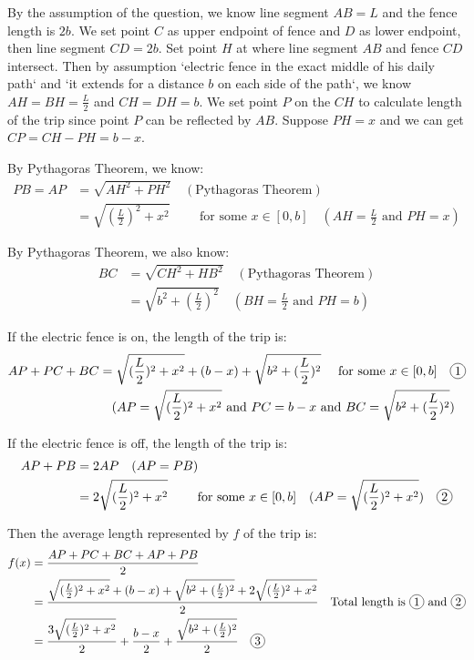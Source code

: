\documentclass[12pt]{exam}
\newcommand*\circled[1]{\tikz[baseline=(char.base)]{
    \node[shape=circle, draw, inner sep=1pt, 
        minimum height=12pt] (char) {#1};}}
\begin{document}
\begin{enumerate}
By the assumption of the question, we know line segment $AB=L$ and the fence length is $2b$. We set point $C$ as upper endpoint of fence and $D$ as lower endpoint, then line segment $CD=2b$. Set point $H$ at where line segment $AB$ and fence $CD$ intersect. Then by assumption `electric fence in the exact middle of his daily path` and `it extends for a distance $b$ on each side of the path`, we know $AH=BH=\frac{L}{2}$ and $CH=DH=b$. We set point $P$ on the $CH$ to calculate length of the trip since point $P$ can be reflected by $AB$. Suppose $PH=x$ and we can get $CP=CH-PH=b-x$.

By Pythagoras Theorem, we know:
\begin{align*}
    PB=AP&=\sqrt{AH^2+PH^2} \quad(\mbox{Pythagoras Theorem})\\
    &=\sqrt{(\frac{L}{2})^2+x^2} \qquad \mbox{ for some } x\in[0,b] \quad(AH=\frac{L}{2} \mbox{ and } PH=x)
\end{align*}

By Pythagoras Theorem, we also know:
\begin{align*}
    BC&=\sqrt{CH^2+HB^2} \quad(\mbox{Pythagoras Theorem})\\
    &=\sqrt{b^2+(\frac{L}{2})^2}\quad(BH=\frac{L}{2} \mbox{ and } PH=b)
\end{align*}

If the electric fence is on, the length of the trip is:
\begin{align*}
    AP+PC+BC
    &=\sqrt{(\frac{L}{2})^2+x^2}+(b-x)+\sqrt{b^2+(\frac{L}{2})^2} \quad \mbox{ for some } x\in[0,b] \quad \circled{1}\\ &\quad(AP=\sqrt{(\frac{L}{2})^2+x^2}\mbox{ and }PC=b-x\mbox{ and }BC=\sqrt{b^2+(\frac{L}{2})^2})
\end{align*}

If the electric fence is off, the length of the trip is:
\begin{align*}
    AP+PB&=2AP \quad(AP=PB)\\
    &=2\sqrt{(\frac{L}{2})^2+x^2} \qquad \mbox{ for some } x\in[0,b] \quad(AP=\sqrt{(\frac{L}{2})^2+x^2}) \quad \circled{2}
\end{align*}

Then the average length represented by $f$ of the trip is:
\begin{align*}
    f(x)&=\frac{AP+PC+BC+AP+PB}{2}\\
    &=\frac{\sqrt{(\frac{L}{2})^2+x^2}+(b-x)+\sqrt{b^2+(\frac{L}{2})^2}+2\sqrt{(\frac{L}{2})^2+x^2}}{2} \quad\mbox{Total length is }\mbox{\circled{1} and \circled{2}}\\
    &=\frac{3\sqrt{(\frac{L}{2})^2+x^2}}{2}+\frac{b-x}{2}+\frac{\sqrt{b^2+(\frac{L}{2})^2}}{2} \quad\circled{3}
\end{align*}


\end{enumerate}
\end{document}
